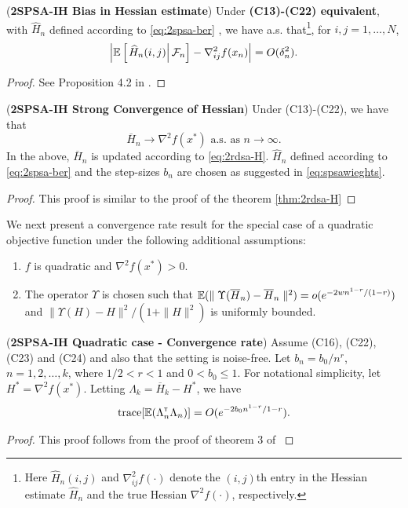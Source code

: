 \documentclass[twocolumn]{IEEEtran}
\begin{document}
\begin{lemma}(\textbf{2SPSA-IH Bias in Hessian estimate})
\label{lemma:2spsa-bias}
Under \textbf{(C13)-(C22) equivalent}, with $\widehat H_n$ defined according to  \eqref{eq:2spsa-ber} , we have a.s. that\footnote{Here $\widehat H_n(i,j)$ and $\nabla^2_{ij}f(\cdot)$ denote the $(i,j)$th entry in the Hessian estimate $\widehat H_n$ and the true Hessian $\nabla^2 f(\cdot)$, respectively.}, for $i,j = 1,\ldots,N$,
\begin{align}
\left|\mathbb{E}\left[
\left. \widehat H_n(i,j) \right| \mathcal{F}_n \right] - \nabla^2_{ij} f(x_n)\right| = O(\delta_n^2).
\end{align} 
\end{lemma}
\begin{proof}
See Proposition 4.2 in \cite{bhatnagar2015simultaneous}.
\end{proof}

\begin{theorem}(\textbf{2SPSA-IH Strong Convergence of Hessian})
\label{thm:2spsa-H}
Under (C13)-(C22), we have that 
$$\overline H_n \rightarrow \nabla^2 f(x^*) \text{ a.s. as } n\rightarrow \infty.$$ 
In the above, $\overline H_n$ is updated according to \eqref{eq:2rdsa-H}. $\widehat H_n$ defined according to \eqref{eq:2spsa-ber} and the step-sizes $b_n$ are chosen as suggested in \eqref{eq:spsawieghts}. 
\end{theorem}
\begin{proof}
This proof is similar to the proof of the theorem \ref{thm:2rdsa-H}
\end{proof}

We next present a convergence rate result for the special case of a quadratic objective function under the following additional assumptions:
\begin{enumerate}[label=(\textbf{C\arabic*}),resume]
\item  $f$ is quadratic and $\nabla^2 f(x^*) > 0$. 
\item The operator $\Upsilon$ is chosen such that $\mathbb{E}(\parallel \Upsilon(\overline H_n) - \overline H_n\parallel^2) = o(e^{-2wn^{1-r}/(1-r)})$ and $\parallel \Upsilon(H) - H \parallel^2 / (1+\parallel H \parallel^2)$ is uniformly bounded.
\end{enumerate}
\begin{theorem}(\textbf{2SPSA-IH Quadratic case - Convergence rate})
\label{thm:spsaquad-bound}
Assume (C16), (C22), (C23) and (C24) and also that the setting is noise-free. 
Let $b_n = b_0/n^r$, $n=1,2,\ldots,k$, where $1/2 < r < 1$ and $0 < b_0 \leq 1$. For notational simplicity, let $H^*=\nabla^2 f(x^*)$. Letting $\Lambda_k = \overline H_k - H^*$, we have 
\begin{align}
\text{trace}[\E (\Lambda_n \tr \Lambda_n)] = O(e^{-2b_0n^{1-r} / {1-r}}).
\label{eq:spsaquad-bigo}
\end{align}
\end{theorem}
\begin{proof}
This proof follows from the proof of theorem 3 of \cite{spall-jacobian}
\end{proof}
\end{document}
